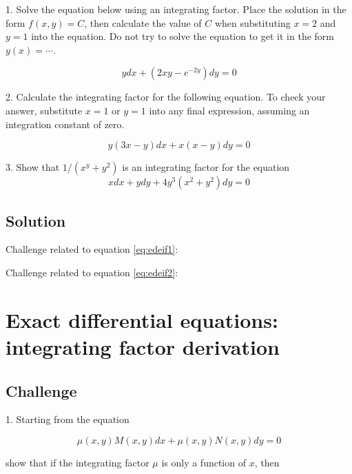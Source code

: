 1. Solve the equation below using an integrating factor. Place the solution in the form $f(x,y) = C$, then calculate the value of $C$ when substituting $x=2$ and $y=1$ into the equation. Do not try to solve the equation to get it in the form $y(x)=\cdots$.

\begin{equation}
    \label{eq:edeif1}
    y dx + (2 x y - e^{-2 y}) dy = 0
\end{equation}

2. Calculate the integrating factor for the following equation. To check your answer, substitute $x=1$ or $y=1$ into any final expression, assuming an integration constant of zero.

\begin{equation}
    \label{eq:edeif2}
    y(3x-y) dx + x(x-y)dy = 0
\end{equation}

3. Show that $1/(x^y+y^2)$ is an integrating factor for the equation
\begin{equation}
    x dx + y dy + 4 y^3 (x^2 + y^2)dy = 0
\end{equation}

\subsection*{Solution}
Challenge related to equation \ref{eq:edeif1}: 

Challenge related to equation \ref{eq:edeif2}: 

\timebox




\newpage
\section{Exact differential equations: integrating factor derivation}
\label{sec:intfacderiv}

\subsection*{Challenge}
1. Starting from the equation

\begin{equation}
    \mu(x,y) M(x,y) dx + \mu(x,y) N(x,y) dy = 0
\end{equation}

show that if the integrating factor $\mu$ is only a function of $x$, then

